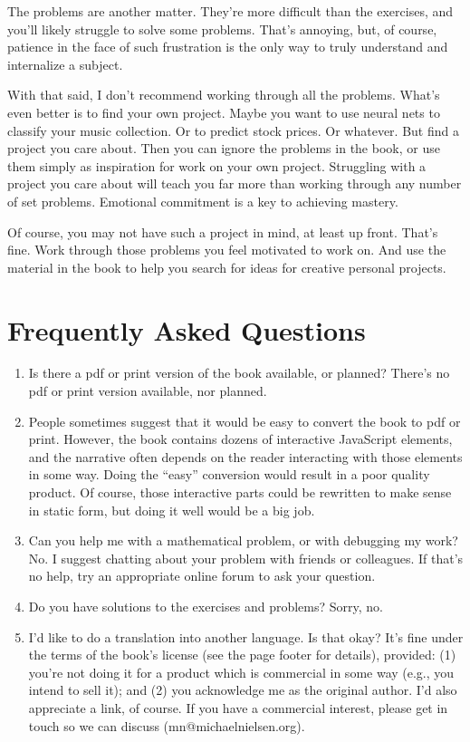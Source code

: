 The problems are another matter. They're more difficult than the exercises, and you'll likely struggle to solve some problems. That's annoying, but, of course, patience in the face of such frustration is the only way to truly understand and internalize a subject.

With that said, I don't recommend working through all the problems. What's even better is to find your own project. Maybe you want to use neural nets to classify your music collection. Or to predict stock prices. Or whatever. But find a project you care about. Then you can ignore the problems in the book, or use them simply as inspiration for work on your own project. Struggling with a project you care about will teach you far more than working through any number of set problems. Emotional commitment is a key to achieving mastery.

Of course, you may not have such a project in mind, at least up front. That's fine. Work through those problems you feel motivated to work on. And use the material in the book to help you search for ideas for creative personal projects.

\section*{Frequently Asked Questions}
\label{sec:FrequentlyAskedQuestions}

\begin{enumerate}

\item
Is there a pdf or print version of the book available, or planned? There's no pdf or print version available, nor planned.

\item
People sometimes suggest that it would be easy to convert the book to pdf or print. However, the book contains dozens of interactive JavaScript elements, and the narrative often depends on the reader interacting with those elements in some way. Doing the ``easy'' conversion would result in a poor quality product. Of course, those interactive parts could be rewritten to make sense in static form, but doing it well would be a big job.

\item
Can you help me with a mathematical problem, or with debugging my work? No. I suggest chatting about your problem with friends or colleagues. If that's no help, try an appropriate online forum to ask your question.

\item
Do you have solutions to the exercises and problems? Sorry, no.

\item
I'd like to do a translation into another language. Is that okay? It's fine under the terms of the book's license (see the page footer for details), provided: (1) you're not doing it for a product which is commercial in some way (e.g., you intend to sell it); and (2) you acknowledge me as the original author. I'd also appreciate a link, of course. If you have a commercial interest, please get in touch so we can discuss (mn@michaelnielsen.org).
\end{enumerate}

